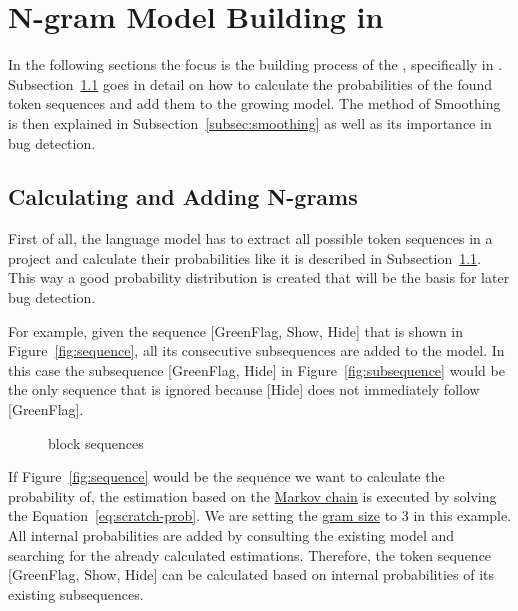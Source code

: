 \section{N-gram Model Building in \scratch{}}\label{sec:model}
In the following sections the focus is the building process of the \ngram{}, specifically in \scratch{}. Subsection~\ref{subsec:n-grams} goes in detail on how to calculate the probabilities of the found token sequences and add them to the growing model. The method of Smoothing is then explained in Subsection~\ref{subsec:smoothing} as well as its importance in bug detection.

\subsection{Calculating and Adding N-grams}\label{subsec:n-grams}
First of all, the language model has to extract all possible token sequences in a \scratch{} project and calculate their probabilities like it is described in Subsection~\ref{subsec:n-grams}. This way a good probability distribution is created that will be the basis for later bug detection. 

For example, given the sequence [GreenFlag, Show, Hide] that is shown in Figure~\ref{fig:sequence}, all its consecutive subsequences are added to the model. In this case the subsequence [GreenFlag, Hide] in Figure~\ref{fig:subsequence} would be the only sequence that is ignored because [Hide] does not immediately follow [GreenFlag]. 

\begin{figure}%
    \centering
    \qquad
    \caption[\scratch{} block sequences]{\label{fig:sequences}\scratch{} block sequences}%
\end{figure}

If Figure~\ref{fig:sequence} would be the sequence we want to calculate the probability of, the estimation based on the \hyperref[def:markov_chain]{Markov chain} is executed by solving the Equation~\ref{eq:scratch-prob}. We are setting the \hyperref[def:gram size]{gram size} to 3 in this example. All internal probabilities are added by consulting the existing model and searching for the already calculated estimations. Therefore, the token sequence [GreenFlag, Show, Hide] can be calculated based on internal probabilities of its existing subsequences.

